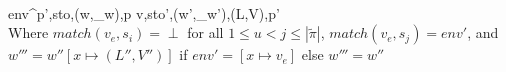 \\[0.2cm]
	{env\vdash \left\langle {}^{p'},sto,(w,\sqsubseteq_w),p \right\rangle \rightarrow \left\langle v,sto',(w',\sqsubseteq_w'),(L,V),p' \right\rangle}\\[0.3cm]
	Where $match(v_e,s_i)=\perp$ for all $1\leq u<j\leq|\tilde{\pi}|$, $match(v_e,s_j)=env'$, and \\
	$w'''=w''[x\mapsto(L'',V'')]$ if $env'=[x\mapsto v_e]$ else $w'''=w''$

